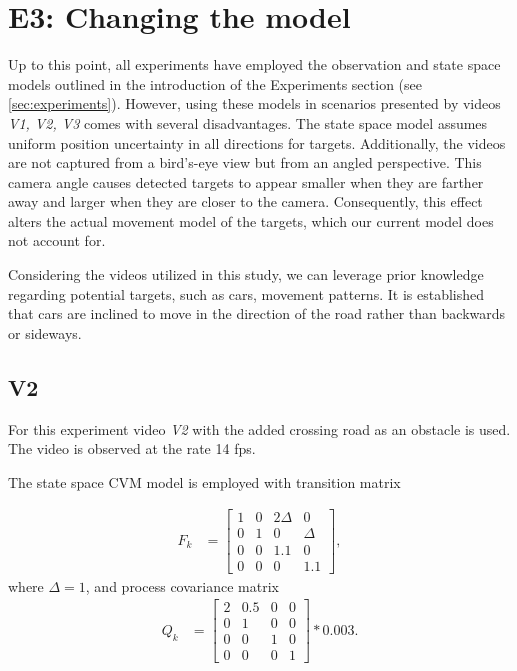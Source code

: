 \section{E3: Changing the model}
\renewcommand{\Ex}{E3}
Up to this point, all experiments have employed the observation and state space models outlined in the introduction of the Experiments section (see \ref{sec:experiments}). However, using these models in scenarios presented by videos \textit{V1, V2, V3} comes with several disadvantages. The state space model assumes uniform position uncertainty in all directions for targets. Additionally, the videos are not captured from a bird's-eye view but from an angled perspective. This camera angle causes detected targets to appear smaller when they are farther away and larger when they are closer to the camera. Consequently, this effect alters the actual movement model of the targets, which our current model does not account for.


Considering the videos utilized in this study, we can leverage prior knowledge regarding potential targets, such as cars, movement patterns. It is established that cars are inclined to move in the direction of the road rather than backwards or sideways.
\subsection{V2}
\renewcommand{\Vs}{V2}
For this experiment video \textit{V2} with the added crossing road as an obstacle is used. The video is observed at the rate 14 fps.

The state space CVM model is employed with transition matrix

\begin{align}
    F_k &=
    \begin{bmatrix}
        1 & 0 & 2\Delta & 0\\
        0 & 1 & 0 & \Delta \\
        0 & 0 & 1.1 & 0 \\
        0 & 0 & 0 & 1.1
    \end{bmatrix},
\end{align}
where $\Delta = 1$,
and process covariance matrix
\begin{align}
    Q_k &=
    \begin{bmatrix}
        2 & 0.5 & 0 & 0\\
        0 & 1 & 0 & 0 \\
        0 & 0 & 1 & 0 \\
        0 & 0 & 0 & 1
    \end{bmatrix}
    * 0.003.
    \label{eq:exp_E3-V2_Q}
\end{align}

